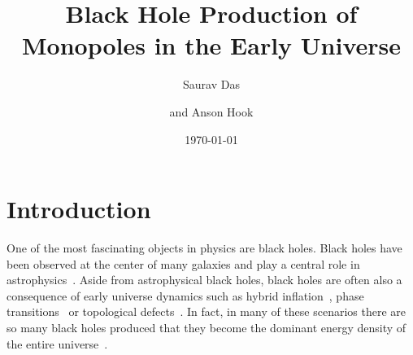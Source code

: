 \documentclass[superscriptaddress,groupedaddress,nofootnoteinbib,11pt]{article}
\begin{document}
\title{Black Hole Production of Monopoles in the Early Universe}

\date{\today}
\author[a]{Saurav Das}
\author[a]{and Anson Hook}





\maketitle


\section{Introduction}

One of the most fascinating objects in physics are black holes. 
Black holes have been observed at the center of many galaxies and play a central role in astrophysics~\cite{LIGOScientific:2016aoc,EventHorizonTelescope:2019dse}.
Aside from astrophysical black holes, black holes are often also a consequence of early universe dynamics such as hybrid inflation~\cite{Linde:1993cn,Garcia-Bellido:1996mdl,Garcia-Bellido:1997hex,lyth2011primordial,Bugaev:2011wy,Clesse:2015wea,Kawasaki:2015ppx,Kawasaki:2016pql}, phase transitions~\cite{Crawford:1982yz,PhysRevD.26.2681,Freivogel:2007fx,Moss:1994pi,Johnson:2011wt,Jedamzik:1999am,Baker:2021nyl,Lewicki:2019gmv} or topological defects~\cite{Hawking:1987bn,Polnarev:1988dh}.
In fact, in many of these scenarios there are so many black holes produced that they become the dominant energy density of the entire universe~\cite{Hawking:1971ei,Chapline:1975ojl,Carr:2016drx,Carr:2020xqk,Green:2020jor,Villanueva-Domingo:2021spv,Young:2015kda}.
\end{document}
